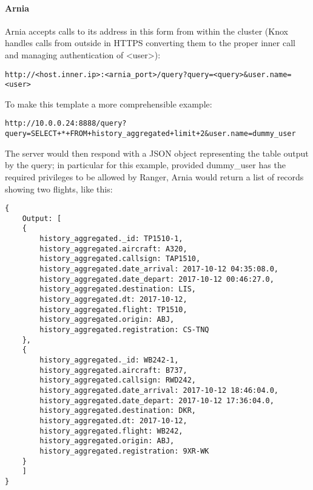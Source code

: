 \paragraph{Arnia}

Arnia accepts calls to its address in this form from within the cluster (Knox handles calls from outside in HTTPS converting them to the proper inner call and managing authentication of <user>): 

\begin{code}
	\begin{verbatim}
http://<host.inner.ip>:<arnia_port>/query?query=<query>&user.name=<user>
	\end{verbatim}
\end{code}

To make this template a more comprehensible example:

\begin{code}
	\begin{verbatim}
http://10.0.0.24:8888/query?query=SELECT+*+FROM+history_aggregated+limit+2&user.name=dummy_user
	\end{verbatim}
\end{code}

\pagebreak
The server would then respond with a JSON object representing the table output by the query; in particular for this example, provided dummy\_user has the required privileges to be allowed by Ranger, Arnia would return a list of records showing two flights, like this:
\\
\begin{code}
	\begin{verbatim}
{
    Output: [
    {
        history_aggregated._id: TP1510-1, 
        history_aggregated.aircraft: A320, 
        history_aggregated.callsign: TAP1510, 
        history_aggregated.date_arrival: 2017-10-12 04:35:08.0, 
        history_aggregated.date_depart: 2017-10-12 00:46:27.0, 
        history_aggregated.destination: LIS, 
        history_aggregated.dt: 2017-10-12, 
        history_aggregated.flight: TP1510, 
        history_aggregated.origin: ABJ, 
        history_aggregated.registration: CS-TNQ
    }, 
    {
        history_aggregated._id: WB242-1, 
        history_aggregated.aircraft: B737, 
        history_aggregated.callsign: RWD242, 
        history_aggregated.date_arrival: 2017-10-12 18:46:04.0, 
        history_aggregated.date_depart: 2017-10-12 17:36:04.0, 
        history_aggregated.destination: DKR, 
        history_aggregated.dt: 2017-10-12, 
        history_aggregated.flight: WB242, 
        history_aggregated.origin: ABJ, 
        history_aggregated.registration: 9XR-WK
    }
    ]
}
	\end{verbatim}
\end{code}

